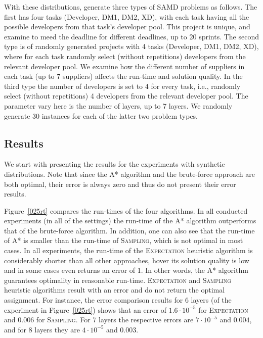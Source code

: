 \documentclass[letterpaper]{article} %
\newcommand{\astar}{\textsc{A*}\xspace}
\newcommand{\sampling}{\textsc{Sampling}\xspace}
\newcommand{\expectation}{\textsc{Expectation}\xspace}
\begin{document}
With these distributions,  generate three types of SAMD problems as follows. The first has four tasks (Developer, DM1, DM2, XD), with each task having all the possible developers from that task's developer pool. This project is unique, and  examine to meed the deadline for different deadlines, up to 20 sprints. The second type is of randomly generated projects with 4 tasks (Developer, DM1, DM2, XD), where for each task  randomly select (without repetitions) developers from the relevant developer pool. We examine how the different number of suppliers in each task (up to 7 suppliers) affects the run-time and solution quality.
In the third type the number of developers is set to 4 for every task, i.e.,  randomly select (without repetitions) 4 developers from the relevant developer pool. The parameter  vary here is the number of layers, up to 7 layers. We randomly generate 30 instances for each of the latter two problem types.


\subsection{Results}
\label{sec:res}

We start with presenting the results for the experiments with synthetic distributions. Note that since the \astar algorithm and the brute-force approach are both optimal, their error is always zero and thus  do not present their error results.

Figure~\ref{025rt} compares the run-times of the four algorithms.
In all conducted experiments (in all of the settings) the run-time of the \astar algorithm outperforms that of the brute-force algorithm. In addition, one can also see that the run-time of \astar is smaller than the run-time of \sampling, which is not optimal in most cases. In all experiments, the run-time of the \expectation heuristic algorithm is considerably shorter than all other approaches, hover its solution quality is low and in some cases even returns an error of 1.
In other words, the \astar algorithm guarantees optimality in reasonable run-time. \expectation and \sampling heuristic algorithms result with an error and do not return the optimal assignment.
For instance, the error comparison results for 6 layers (of the experiment in Figure~\ref{025rt}) shows that an error of $1.6\cdot 10^{-5}$ for \expectation and $0.006$ for \sampling. For 7 layers the respective errors are $7 \cdot 10^{-5}$ and $0.004$, and for 8 layers they are $4 \cdot 10^{-5}$ and $0.003$. %
\end{document}
